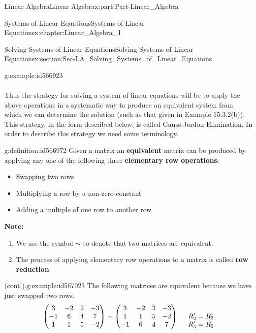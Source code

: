\documentclass[oneside,10pt,]{book}
\newcommand{\terminology}[1]{\textbf{#1}}
\numberwithin{equation}{section}
\newcommand{\amp}{&}
\begin{document}
\begin{partptx}{Linear Algebra}{}{Linear Algebra}{}{}{x:part:Part-Linear_Algebra}
\begin{chapterptx}{Systems of Linear Equations}{}{Systems of Linear Equations}{}{}{x:chapter:Linear_Algebra_1}
\begin{sectionptx}{Solving Systems of Linear Equations}{}{Solving Systems of Linear Equations}{}{}{x:section:Sec-LA_Solving_Systems_of_Linear_Equations}
\begin{example}{}{g:example:id566923}
\begin{align*}
\end{align*}
%
\end{example}
Thus the strategy for solving a system of linear equations will be to apply the above operations in a systematic way to produce an equivalent system from which we can determine the solution (such as that given in Example 15.3.2(b)). This strategy, in the form described below, is called Gauss-Jordon Elimination. In order to describe this strategy we need some terminology.%
\begin{definition}{}{g:definition:id566972}%
Given a matrix an \terminology{equivalent} matrix can be produced by applying any one of the following three \terminology{elementary row operations}:%
\par
%
\begin{itemize}[label=\textbullet]
\item{}Swapping two rows%
\item{}Multiplying a row by a non-zero constant%
\item{}Adding a multiple of one row to another row%
\end{itemize}
%
\end{definition}
\terminology{Note:}%
\par
%
\begin{enumerate}[label=\roman*.]
\item{}We use the symbol \(\sim\)  to denote that two matrices are equivalent.%
\item{}The process of applying elementary row operations to a matrix is called \terminology{row reduction}%
\end{enumerate}
%
\begin{example}{(cont.).}{g:example:id567023}%
The following matrices are equivalent because we have just swapped two rows.%
\begin{equation*}
\begin{pmatrix} 3 \amp -2 \amp 2 \amp -3 \\ -1 \amp 6 \amp 4 \amp 7 \\ 1 \amp 1 \amp 5 \amp -2 \end{pmatrix} \sim \begin{pmatrix} 3 \amp -2 \amp 2 \amp -3 \\ 1 \amp 1 \amp 5 \amp -2 \\ -1 \amp 6 \amp 4 \amp 7 \end{pmatrix}  \begin{matrix} \\ \hspace{5mm} R_2'=R_3 \\ \hspace{5mm} R_3'=R_2 \end{matrix}

\end{equation*}
\end{example}
\end{sectionptx}
\end{chapterptx}
\end{partptx}
\end{document}
